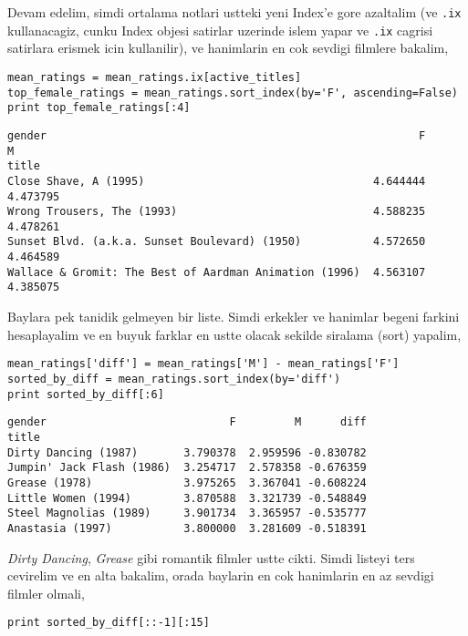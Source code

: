 \documentclass[12pt,fleqn]{article}\usepackage{../common}
\begin{document}
Devam edelim, simdi ortalama notlari ustteki yeni Index'e gore
azaltalim (ve \verb!.ix! kullanacagiz, cunku Index objesi
satirlar uzerinde islem yapar ve \verb!.ix! cagrisi satirlara
erismek icin kullanilir), ve hanimlarin en cok sevdigi filmlere
bakalim,

\begin{verbatim}
mean_ratings = mean_ratings.ix[active_titles]
top_female_ratings = mean_ratings.sort_index(by='F', ascending=False)
print top_female_ratings[:4]
\end{verbatim}

\begin{verbatim}
gender                                                         F         M
title                                                                     
Close Shave, A (1995)                                   4.644444  4.473795
Wrong Trousers, The (1993)                              4.588235  4.478261
Sunset Blvd. (a.k.a. Sunset Boulevard) (1950)           4.572650  4.464589
Wallace & Gromit: The Best of Aardman Animation (1996)  4.563107  4.385075
\end{verbatim}

Baylara pek tanidik gelmeyen bir liste. Simdi erkekler ve hanimlar
begeni farkini hesaplayalim ve en buyuk farklar en ustte olacak
sekilde siralama (sort) yapalim,

\begin{verbatim}
mean_ratings['diff'] = mean_ratings['M'] - mean_ratings['F']
sorted_by_diff = mean_ratings.sort_index(by='diff')
print sorted_by_diff[:6] 
\end{verbatim}

\begin{verbatim}
gender                            F         M      diff
title                                                  
Dirty Dancing (1987)       3.790378  2.959596 -0.830782
Jumpin' Jack Flash (1986)  3.254717  2.578358 -0.676359
Grease (1978)              3.975265  3.367041 -0.608224
Little Women (1994)        3.870588  3.321739 -0.548849
Steel Magnolias (1989)     3.901734  3.365957 -0.535777
Anastasia (1997)           3.800000  3.281609 -0.518391
\end{verbatim}

{\em Dirty Dancing}, {\em Grease} gibi romantik filmler ustte cikti. Simdi
listeyi ters cevirelim ve en alta bakalim, orada baylarin en cok
hanimlarin en az sevdigi filmler olmali,

\begin{verbatim}
print sorted_by_diff[::-1][:15]
\end{verbatim}
\end{document}
